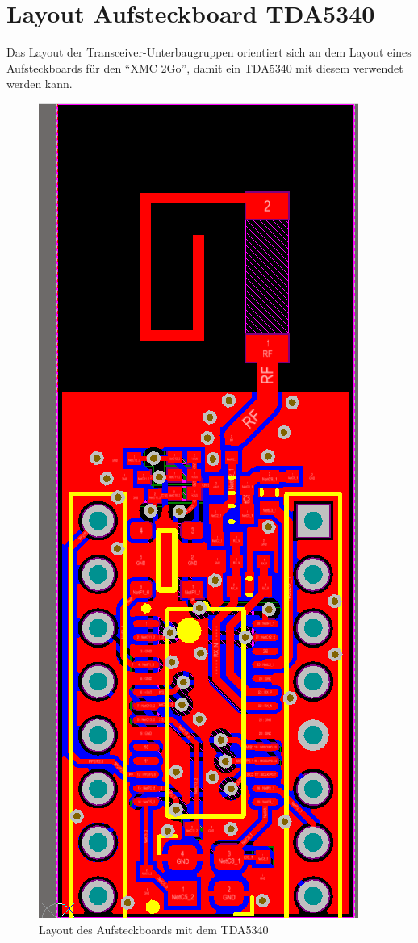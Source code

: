 \section{Layout Aufsteckboard TDA5340}
\label{app:Aufsteckboard}
Das Layout der Transceiver-Unterbaugruppen orientiert sich an dem Layout eines Aufsteckboards für den \enquote{XMC 2Go}, damit ein TDA5340 mit diesem verwendet werden kann. 

\begin{figure}[H] 
	\centering
	\includegraphics[height=\textwidth, angle=-90 ]{Abbildungen/Aufnahmen/Bilder/Altium/Layout_Stefan_Erhard/Layout.png}
	\caption{Layout des Aufsteckboards mit dem TDA5340}
	\label{fig:AufsteckboardTDA}
\end{figure}